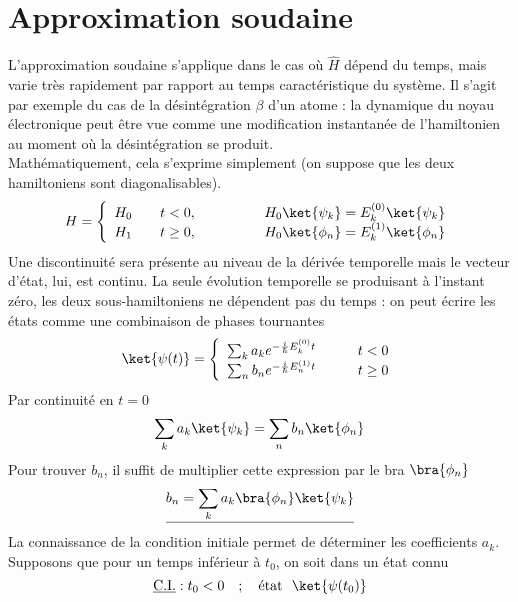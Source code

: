\section{Approximation soudaine}
L'approximation soudaine s'applique dans le cas où $\hat{H}$ dépend du temps, mais varie très rapidement 
par rapport au temps caractéristique du système. Il s'agit par exemple du cas de la désintégration 
$\beta$ d'un atome : la dynamique du noyau électronique peut être vue comme une modification 
instantanée de l'hamiltonien au moment où la désintégration se produit.\\
Mathématiquement, cela s'exprime simplement (on suppose que les deux hamiltoniens sont diagonalisables).
\begin{equation}
H = \left\{\begin{array}{lll}
H_0 &\quad t<0,&\qquad\qquad H_0\ket{\psi_k}=E_k^{(0)}\ket{\psi_k}\\
H_1 &\quad t\geq0,&\qquad\qquad H_0\ket{\phi_n}=E_k^{(1)}\ket{\phi_n}
\end{array}\right.
\end{equation}
Une discontinuité sera présente au niveau de la dérivée temporelle mais le vecteur d'état, lui, est 
continu. La seule évolution temporelle se produisant à l'instant zéro, les deux sous-hamiltoniens ne 
dépendent pas du temps : on peut écrire les états comme une combinaison de phases tournantes
\begin{equation}
\ket{\psi(t)} = \left\{\begin{array}{lll}
\sum_k a_ke^{-\frac{i}{\hbar}E_k^{(0)}t}&\qquad t<0\\
\sum_n b_ne^{-\frac{i}{\hbar}E_n^{(1)}t}&\qquad t\geq0
\end{array}\right.
\end{equation}
Par continuité en $t=0$
\begin{equation}
\sum_k a_k\ket{\psi_k} = \sum_n b_n\ket{\phi_n}
\end{equation}
Pour trouver $b_n$, il suffit de multiplier cette expression par le bra $\bra{\phi_n}$
\begin{equation}
\underline{b_n = \sum_k a_k\bra{\phi_n}\ket{\psi_k}}
\end{equation}
La connaissance de la condition initiale permet de déterminer les coefficients $a_k$. Supposons 
que pour un temps inférieur à $t_0$, on soit dans un état connu
\begin{equation}
\underline{\text{C.I.}} : t_0 < 0\quad ; \quad \text{état }\ \ket{\psi(t_0)}
\end{equation}

